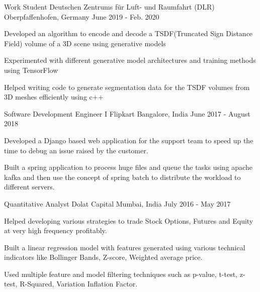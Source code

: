 
\begin{cventries}
  \cventry
    {Work Student} %
    {Deutschen Zentrums für Luft- und Raumfahrt (DLR)} %
    {Oberpfaffenhofen, Germany} %
    {June 2019 - Feb. 2020} %
    {
      \begin{cvitems} %
        \item {Developed an algorithm to encode and decode a TSDF(Truncated Sign Distance Field) volume of a 3D scene using generative models}
        \item {Experimented with different generative model architectures and training methods using TensorFlow}
        \item {Helped writing code to generate segmentation data for the TSDF volumes from 3D meshes efficiently using c++}
      \end{cvitems}
    }

  \cventry
    {Software Development Engineer I} %
    {Flipkart} %
    {Bangalore, India} %
    {June 2017 - August 2018} %
    {
      \begin{cvitems} %
        \item {Developed a Django based web application for the support team to speed up the time to debug an issue raised by the customer.}
        \item {Built a spring application to process huge files and queue the tasks using apache kafka and then use the concept of spring batch to distribute the workload to different servers.}
      \end{cvitems}
    }

  \cventry
    {Quantitative Analyst} %
    {Dolat Capital} %
    {Mumbai, India} %
    {July 2016 - May 2017} %
    {
      \begin{cvitems} %
        \item {Helped developing various strategies to trade Stock Options, Futures and Equity at very high frequency profitably.}
        \item {Built a linear regression model with features generated using various technical indicators like Bollinger Bands, Z-score, Weighted average price.}
        \item {Used multiple feature and model filtering techniques such as p-value, t-test, z-test, R-Squared, Variation Inflation Factor.}
      \end{cvitems}
    }


\end{cventries}
